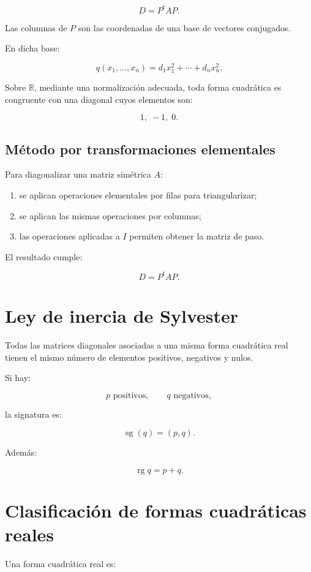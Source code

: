 \documentclass[11pt,a4paper]{article}
\newcommand{\R}{\mathbb{R}}
\newcommand{\rg}{\operatorname{rg}}
\newcommand{\sg}{\operatorname{sg}}
\begin{document}
\[
\boxed{
D=P^tAP.
}
\]

Las columnas de $P$ son las coordenadas de una base de vectores conjugados.

En dicha base:

\[
\boxed{
q(x_1,\ldots,x_n)
=
d_1x_1^2+\cdots+d_nx_n^2.
}
\]

Sobre $\R$, mediante una normalización adecuada, toda forma cuadrática es congruente con una diagonal cuyos elementos son:

\[
\boxed{
1,\;-1,\;0.
}
\]

\subsection{Método por transformaciones elementales}

Para diagonalizar una matriz simétrica $A$:

\begin{enumerate}
\item se aplican operaciones elementales por filas para triangularizar;
\item se aplican las mismas operaciones por columnas;
\item las operaciones aplicadas a $I$ permiten obtener la matriz de paso.
\end{enumerate}

El resultado cumple:

\[
\boxed{
D=P^tAP.
}
\]

\section{Ley de inercia de Sylvester}

Todas las matrices diagonales asociadas a una misma forma cuadrática real tienen el mismo número de elementos positivos, negativos y nulos.

Si hay:

\[
p\text{ positivos},
\qquad
q\text{ negativos},
\]

la signatura es:

\[
\boxed{
\sg(q)=(p,q).
}
\]

Además:

\[
\boxed{
\rg q=p+q.
}
\]

\section{Clasificación de formas cuadráticas reales}

Una forma cuadrática real es:
\end{document}
